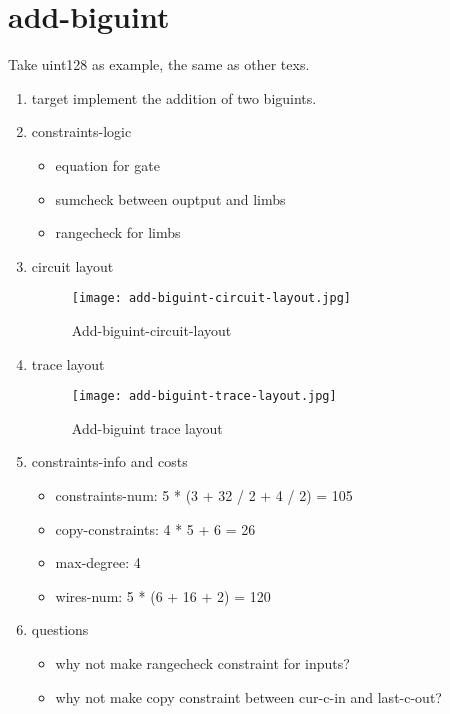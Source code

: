 \section{add-biguint}
\label{add-biguint}

Take uint128 as example, the same as other texs.

\begin{enumerate}
    \item target
        implement the addition of two biguints.
    \item constraints-logic
        \begin{itemize}
            \item equation for gate
            \item sumcheck between ouptput and limbs
            \item rangecheck for limbs
        \end{itemize}
    \item circuit layout
        \begin{figure}[!ht]
            \centering
            \texttt{[image: add-biguint-circuit-layout.jpg]}
            \caption{Add-biguint-circuit-layout}
            \label{fig:add-biguint-circuit-layout}
        \end{figure}

    \item trace layout
        \begin{figure}[!ht]
            \centering
            \texttt{[image: add-biguint-trace-layout.jpg]}
            \caption{Add-biguint trace layout}
            \label{fig:add-biguint-trace-layout}
        \end{figure}
    
    \item constraints-info and costs
        \begin{itemize}
            \item constraints-num: 5 * (3 + 32 / 2 + 4 / 2) = 105
            \item copy-constraints: 4 * 5 + 6 = 26
            \item max-degree: 4
            \item wires-num: 5 * (6 + 16 + 2) = 120
        \end{itemize}

    \item questions
        \begin{itemize}
            \item why not make rangecheck constraint for inputs?
            \item why not make copy constraint between cur-c-in and last-c-out?
        \end{itemize}

\end{enumerate}